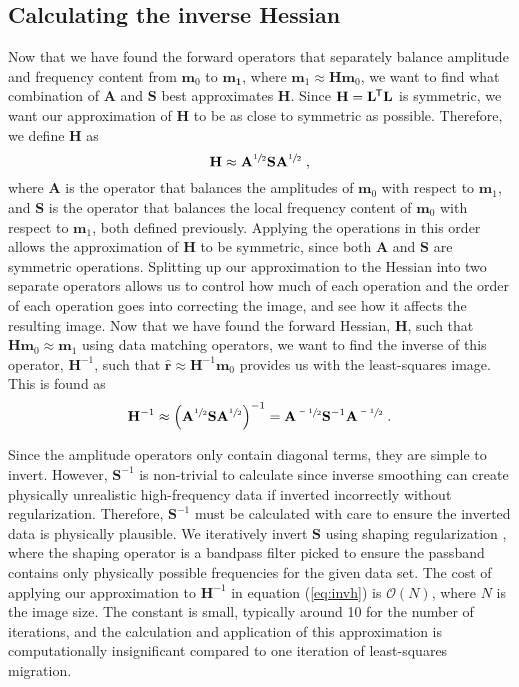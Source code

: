 \subsection{Calculating the inverse Hessian}
    Now that we have found the forward operators that separately balance amplitude and frequency content from $\mathbf{m}_0$ to $\mathbf{m_1}$, where $\mathbf{m}_1 \approx \mathbf{H} \mathbf{m}_0$, we want to find what combination of $\mathbf{A}$ and $\mathbf{S}$ best approximates $\mathbf{H}$.
    Since $\mathbf{H} = \mathbf{L}^{\mkern-1.5mu\mathsf{T}}\mathbf{L}$ is symmetric, we want our approximation of $\mathbf{H}$ to be as close to symmetric as possible.
    Therefore, we define $\mathbf{H}$ as
    \begin{equation}
        \mathbf{H} \approx \mathbf{A}^{\sfrac{1}{2}}\mathbf{S}\mathbf{A}^{\sfrac{1}{2}} \;,
    \end{equation}
    where $\mathbf{A}$ is the operator that balances the amplitudes of $\mathbf{m}_0$ with respect to $\mathbf{m}_1$, and $\mathbf{S}$ is the operator that balances the local frequency content of $\mathbf{m}_0$ with respect to $\mathbf{m}_1$, both defined previously.
    Applying the operations in this order allows the approximation of $\mathbf{H}$ to be symmetric, since both $\mathbf{A}$ and $\mathbf{S}$ are symmetric operations. 
    Splitting up our approximation to the Hessian into two separate operators allows us to control how much of each operation and the order of each operation goes into correcting the image, and see how it affects the resulting image.
    Now that we have found the forward Hessian, $\mathbf{H}$, such that $\mathbf{H}\mathbf{m}_0 \approx \mathbf{m}_1$ using data matching operators, we want to find the inverse of this operator, $\mathbf{H}^{-1}$, such that $\hat{\mathbf{r}} \approx \mathbf{H} ^{-1} \mathbf{m}_0$ provides us with the least-squares image.
    This is found as
    \begin{equation}
        \mathbf{H}^{-1} \approx \left ( \mathbf{A}^{\sfrac{1}{2}} \mathbf{S} \mathbf{A}^{\sfrac{1}{2}} \right )^{-1} = 
        \mathbf{A}^{\sfrac{-1}{2}} \mathbf{S}^{-1} \mathbf{A}^{\sfrac{-1}{2}}\;.
        \label{eq:invh}
    \end{equation}

    Since the amplitude operators only contain diagonal terms, they are simple to invert. 
    However, $\mathbf{S}^{-1}$ is non-trivial to calculate since inverse smoothing can create physically unrealistic high-frequency data if inverted incorrectly without regularization.
    Therefore, $\mathbf{S}^{-1}$ must be calculated with care to ensure the inverted data is physically plausible. 
    We iteratively invert $\mathbf{S}$ using shaping regularization \cite[]{shap}, where the shaping operator is a bandpass filter picked to ensure the passband contains only physically possible frequencies for the given data set.
    The cost of applying our approximation to $\mathbf{H}^{-1}$ in equation (\ref{eq:invh}) is $\mathcal{O}(N)$, where $N$ is the image size. 
    The constant is small, typically around 10 for the number of iterations, and the calculation and application of this approximation is computationally insignificant compared to one iteration of least-squares migration. 

